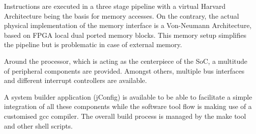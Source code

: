 		Instructions are executed in a three stage pipeline with a virtual Harvard Architecture being the basis for memory accesses. On the contrary, the actual physical implementation of the memory interface is a Von-Neumann Architecture, based on FPGA local dual ported memory blocks. This memory setup simplifies the pipeline but is problematic in case of external memory.

		Around the processor, which is acting as the centerpiece of the SoC, a multitude of peripheral components are provided. Amongst others, multiple bus interfaces and different interrupt controllers are available.

		A system builder application (jConfig) is available to be able to facilitate a simple integration of all these components while the software tool flow is making use of a customised gcc compiler. The overall build process is managed by the make tool and other shell scripts.

